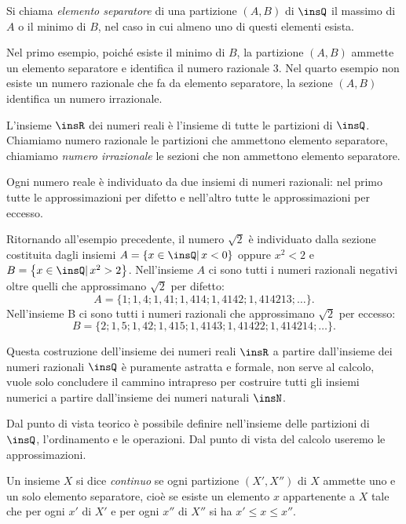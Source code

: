 \begin{definizione}
Si chiama \emph{elemento separatore} di una partizione $(A,B)$ di $\insQ$ il massimo di $A$ o il minimo di $B$, nel caso in cui almeno uno di questi elementi esista.
\end{definizione}

Nel primo esempio, poiché esiste il minimo di $B$, la partizione $(A,B)$ ammette un elemento separatore e identifica il numero razionale $3$.
Nel quarto esempio non esiste un numero razionale che fa da elemento separatore, la sezione $(A,B)$ identifica un numero irrazionale.

\begin{definizione}
L'insieme $\insR$ dei numeri reali è l'insieme di tutte le partizioni di $\insQ$. Chiamiamo
numero razionale le partizioni che ammettono elemento separatore, chiamiamo \emph{numero irrazionale} le sezioni che non ammettono elemento separatore.
\end{definizione}

Ogni numero reale è individuato da due insiemi di numeri razionali: nel primo tutte le approssimazioni per difetto e nell'altro tutte le approssimazioni per eccesso.

Ritornando all'esempio precedente, il numero $\sqrt{2}$ è individuato dalla sezione costituita dagli insiemi $A=\left\{x\in \insQ |\, x<0\right\}$ oppure $x^{2}<2$ e $B=\left\{x\in \insQ |\, x^{2}>2\right\}$.
Nell'insieme $A$ ci sono tutti i numeri razionali negativi oltre quelli che approssimano $\sqrt{2}$ per difetto: \[A=\{1;1,4;1,41;1,414;1,4142;1,414213;\ldots\}.\]
Nell'insieme B ci sono tutti i numeri razionali che approssimano $\sqrt{2}$ per eccesso:
\[B=\{2;1,5;1,42;1,415;1,4143;1,41422;1,414214;\ldots\}.\]

Questa costruzione dell'insieme dei numeri reali $\insR$ a partire dall'insieme dei numeri razionali
$\insQ$ è puramente astratta e formale, non serve al calcolo, vuole solo concludere il cammino intrapreso per costruire tutti gli insiemi numerici a partire dall'insieme dei numeri naturali $\insN$.

Dal punto di vista teorico è possibile definire nell'insieme delle partizioni di $\insQ$, l'ordinamento e le operazioni. Dal punto di vista del calcolo useremo le approssimazioni.

\begin{definizione}
Un insieme $X$ si dice \emph{continuo} se ogni partizione $(X', X'')$ di $X$ ammette uno e un solo elemento separatore, cioè se esiste un elemento $x$ appartenente a $X$ tale che per ogni $x'$ di $X'$ e per ogni $x''$ di $X''$ si ha $x'{\leq}x{\leq}x''$.
\end{definizione}

